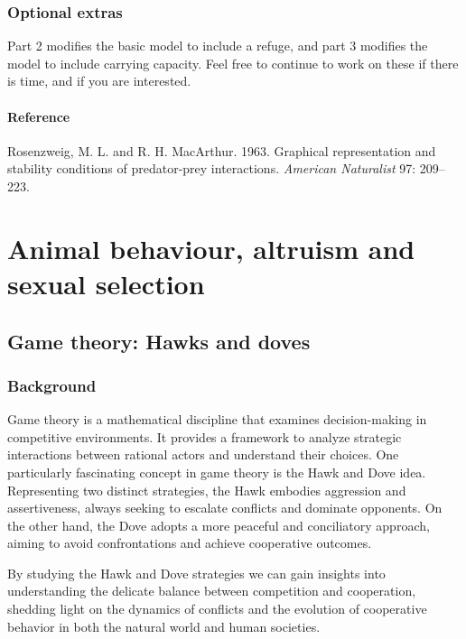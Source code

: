 \documentclass[
  a4paper]{book}
\begin{document}
\hypertarget{optional-extras}{%
\section{Optional extras}\label{optional-extras}}

Part 2 modifies the basic model to include a refuge, and part 3 modifies the model to include carrying capacity. Feel free to continue to work on these if there is time, and if you are interested.

\hypertarget{reference}{%
\subsection{Reference}\label{reference}}

Rosenzweig, M. L. and R. H. MacArthur. 1963. Graphical representation and stability conditions of predator-prey interactions. \emph{American Naturalist} 97: 209--223.

\hypertarget{part-animal-behaviour-altruism-and-sexual-selection}{%
\part{Animal behaviour, altruism and sexual selection}\label{part-animal-behaviour-altruism-and-sexual-selection}}

\hypertarget{game-theory-hawks-and-doves}{%
\chapter{Game theory: Hawks and doves}\label{game-theory-hawks-and-doves}}

\hypertarget{background-14}{%
\section{Background}\label{background-14}}

Game theory is a mathematical discipline that examines decision-making in competitive environments. It provides a framework to analyze strategic interactions between rational actors and understand their choices. One particularly fascinating concept in game theory is the Hawk and Dove idea. Representing two distinct strategies, the Hawk embodies aggression and assertiveness, always seeking to escalate conflicts and dominate opponents. On the other hand, the Dove adopts a more peaceful and conciliatory approach, aiming to avoid confrontations and achieve cooperative outcomes.

By studying the Hawk and Dove strategies we can gain insights into understanding the delicate balance between competition and cooperation, shedding light on the dynamics of conflicts and the evolution of cooperative behavior in both the natural world and human societies.
\end{document}
